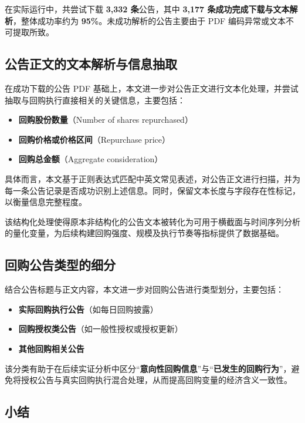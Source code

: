 \documentclass[a4paper,10pt]{article}
\begin{document}
在实际运行中，共尝试下载 \textbf{3,332 条}公告，其中 \textbf{3,177 条成功完成下载与文本解析}，整体成功率约为 \textbf{95\%}。未成功解析的公告主要由于 PDF 编码异常或文本不可提取所致。

\subsection{公告正文的文本解析与信息抽取}

在成功下载的公告 PDF 基础上，本文进一步对公告正文进行文本化处理，并尝试抽取与回购执行直接相关的关键信息，主要包括：

\begin{itemize}
    \item \textbf{回购股份数量}（Number of shares repurchased）
    \item \textbf{回购价格或价格区间}（Repurchase price）
    \item \textbf{回购总金额}（Aggregate consideration）
\end{itemize}

具体而言，本文基于正则表达式匹配中英文常见表述，对公告正文进行扫描，并为每一条公告记录是否成功识别上述信息。同时，保留文本长度与字段存在性标记，以衡量信息完整程度。

该结构化处理使得原本非结构化的公告文本被转化为可用于横截面与时间序列分析的量化变量，为后续构建回购强度、规模及执行节奏等指标提供了数据基础。

\subsection{回购公告类型的细分}

结合公告标题与正文内容，本文进一步对回购公告进行类型划分，主要包括：

\begin{itemize}
    \item \textbf{实际回购执行公告}（如每日回购披露）
    \item \textbf{回购授权类公告}（如一般性授权或授权更新）
    \item \textbf{其他回购相关公告}
\end{itemize}

该分类有助于在后续实证分析中区分“\textbf{意向性回购信息}”与“\textbf{已发生的回购行为}”，避免将授权公告与真实回购执行混合处理，从而提高回购变量的经济含义一致性。

\subsection{小结}
\end{document}
